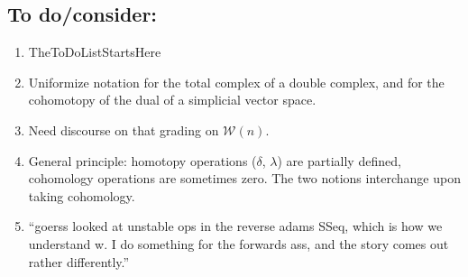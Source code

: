 \documentclass[11pt]{amsart} \renewcommand{\baselinestretch}{1.2}
\theoremstyle{plain}
\numberwithin{equation}{section} %
\theoremstyle{plain}
\numberwithin{equation}{chapter} %
\newcommand{\DASH}{\mathrm{-}}
\newcommand{\squishlist}{
}
\newcommand{\calU}{\mathcal{U}}
\newcommand{\calL}{\mathcal{L}}
\newcommand{\calw}{\mathcal{W}}
\newcommand{\calc}{\mathcal{C}}
\newcommand{\quadgrad}[1]{\mathrm{q}_{#1}}
\newcommand{\SectionOrChapter}[1]{\section{\textbf{#1}}}
\begin{document}
\begin{todolist}
\SectionOrChapter{To do/consider:}
\begin{enumerate}\squishlist
\item TheToDoListStartsHere
\item Uniformize notation for the total complex of a double complex, and for the cohomotopy of the dual of a simplicial vector space.
\item Need discourse on that grading on $\calw(n)$.
\item General principle: homotopy operations ($\delta$, {$\lambda$}) are partially defined, cohomology operations are sometimes zero. The two notions interchange upon taking cohomology.
\item ``goerss looked at unstable ops in the reverse adams SSeq, which is how we understand w. I do something for the forwards ass, and the story comes out rather differently.''

\end{enumerate}
\end{todolist}
\end{document}
